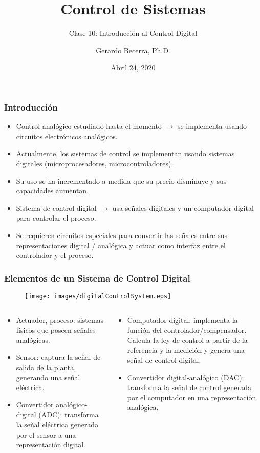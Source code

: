 \documentclass[aspectratio=169,handout]{beamer}
\title{Control de Sistemas}
\subtitle{\small Clase 10: Introducción al Control Digital}
\author{Gerardo Becerra, Ph.D.}
\institute{Pontificia Universidad Javeriana\\ Departamento de Electrónica}
\date{Abril 24, 2020}
\theoremstyle{definition}
\theoremstyle{plain}
\theoremstyle{remark}
\begin{document}
\frame{\titlepage}	

\begin{frame}[<+->]\frametitle{Introducción}
\centering
\begin{itemize}
	\item Control analógico estudiado hasta el momento $\rightarrow$ se implementa usando circuitos electrónicos analógicos.
	\item Actualmente, los sistemas de control se implementan usando sistemas digitales (microprocesadores, microcontroladores).
	\item Su uso se ha incrementado a medida que su precio disminuye y sus capacidades aumentan.
	\item Sistema de control digital $\rightarrow$ usa señales digitales y un computador digital para controlar el proceso.
	\item Se requieren circuitos especiales para convertir las señales entre sus representaciones digital / analógica y actuar como interfaz entre el controlador y el proceso.
\end{itemize}
\end{frame}

\begin{frame}[<+->]\frametitle{Elementos de un Sistema de Control Digital}
	\begin{figure}[h]
		\centering
		\texttt{[image: images/digitalControlSystem.eps]}
	\end{figure}
	\small
	\vspace*{-2mm}
	\begin{columns}
		\begin{column}{0.5\textwidth}
			\begin{itemize}
				\item Actuador, proceso: sistemas físicos que poseen señales analógicas.
				\item Sensor: captura la señal de salida de la planta, generando una señal eléctrica.
				\item Convertidor analógico-digital (ADC): transforma la señal eléctrica generada por el sensor a una representación digital.
			\end{itemize}
		\end{column}
		\begin{column}{0.5\textwidth}
			\begin{itemize}
				\item Computador digital: implementa la función del controlador/compensador. Calcula la ley de control a partir de la referencia y la medición y genera una señal de control digital.
				\item Convertidor digital-analógico (DAC): transforma la señal de control generada por el computador en una representación analógica.
			\end{itemize}
		\end{column}
	\end{columns}
\end{frame}
\end{document}
